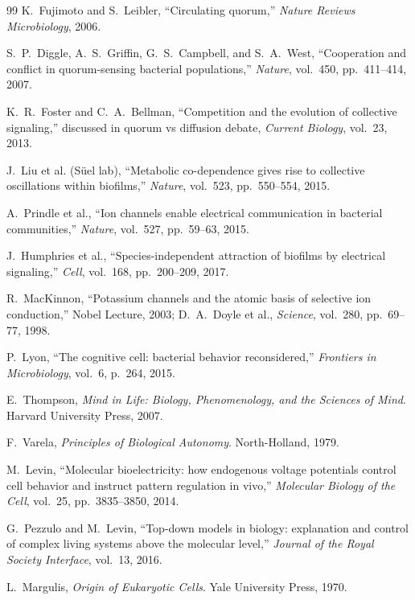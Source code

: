 \documentclass[12pt,a4paper]{article}
\begin{document}
\begin{thebibliography}{99}
K.~Fujimoto and S.~Leibler, ``Circulating quorum,'' \emph{Nature Reviews Microbiology}, 2006.

S.~P.~Diggle, A.~S.~Griffin, G.~S.~Campbell, and S.~A.~West, ``Cooperation and conflict in quorum-sensing bacterial populations,'' \emph{Nature}, vol.~450, pp.~411--414, 2007.

K.~R.~Foster and C.~A.~Bellman, ``Competition and the evolution of collective signaling,'' discussed in quorum vs diffusion debate, \emph{Current Biology}, vol.~23, 2013.

J.~Liu et al. (S\"{u}el lab), ``Metabolic co-dependence gives rise to collective oscillations within biofilms,'' \emph{Nature}, vol.~523, pp.~550--554, 2015.

A.~Prindle et al., ``Ion channels enable electrical communication in bacterial communities,'' \emph{Nature}, vol.~527, pp.~59--63, 2015.

J.~Humphries et al., ``Species-independent attraction of biofilms by electrical signaling,'' \emph{Cell}, vol.~168, pp.~200--209, 2017.

R.~MacKinnon, ``Potassium channels and the atomic basis of selective ion conduction,'' Nobel Lecture, 2003; D.~A.~Doyle et al., \emph{Science}, vol.~280, pp.~69--77, 1998.

P.~Lyon, ``The cognitive cell: bacterial behavior reconsidered,'' \emph{Frontiers in Microbiology}, vol.~6, p.~264, 2015.

E.~Thompson, \emph{Mind in Life: Biology, Phenomenology, and the Sciences of Mind}. Harvard University Press, 2007.

F.~Varela, \emph{Principles of Biological Autonomy}. North-Holland, 1979.

M.~Levin, ``Molecular bioelectricity: how endogenous voltage potentials control cell behavior and instruct pattern regulation in vivo,'' \emph{Molecular Biology of the Cell}, vol.~25, pp.~3835--3850, 2014.

G.~Pezzulo and M.~Levin, ``Top-down models in biology: explanation and control of complex living systems above the molecular level,'' \emph{Journal of the Royal Society Interface}, vol.~13, 2016.

L.~Margulis, \emph{Origin of Eukaryotic Cells}. Yale University Press, 1970.


\end{thebibliography}
\end{document}

